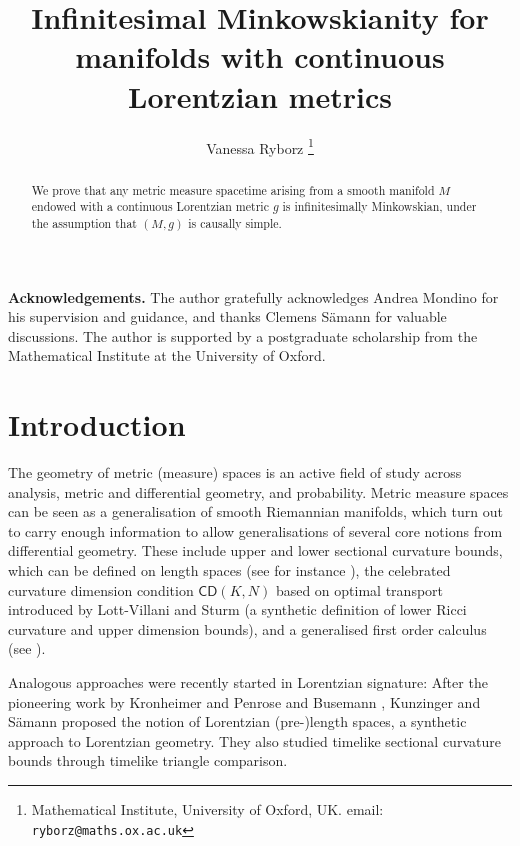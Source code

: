 \documentclass[a4paper,10pt]{article}
\title{Infinitesimal Minkowskianity for manifolds with continuous Lorentzian metrics}
\author{Vanessa Ryborz \thanks{{  Mathematical Institute, University of Oxford, UK. email: {\tt ryborz@maths.ox.ac.uk}}}}
\date{}
\numberwithin{equation}{section}
\newcommand{\cd}{\mathsf{CD}}
\begin{document}
\maketitle
\begin{abstract}
 We prove that any metric measure spacetime arising from a smooth manifold $M$ endowed with a continuous Lorentzian metric $g$ is infinitesimally Minkowskian, under the assumption that $(M, g)$ is causally simple.
 \let\thefootnote\relax{}
\end{abstract}
\tableofcontents

{\small \textbf{Acknowledgements.} 
The author gratefully acknowledges Andrea Mondino for his supervision and guidance, and thanks Clemens Sämann for valuable discussions. The author is supported by a postgraduate scholarship from the Mathematical Institute at the University of Oxford. 
}

\section{Introduction}


The geometry of metric (measure) spaces is an active field of study  across analysis, metric and differential geometry, and probability.
Metric measure spaces can be seen as a generalisation of smooth Riemannian manifolds, which turn out to carry enough information  to allow generalisations of several core notions from differential geometry. These include upper and lower sectional curvature bounds, which can be defined on length spaces (see for instance \cite{alexander2024alexandrov}), the celebrated curvature dimension condition $\cd(K, N)$ based on optimal transport introduced by Lott-Villani \cite{lott2009ricci, LottVillaniJFA} and Sturm \cite{sturm2006geometryI, sturm2006geometryII} (a synthetic definition of lower Ricci curvature and upper dimension bounds), and a generalised first order calculus (see \cite{ambrosio2014inventio}). 

Analogous approaches were recently started in Lorentzian signature: After the pioneering work by Kronheimer and Penrose \cite{kronheimer1967structure} and Busemann \cite{busemann1967timelike}, Kunzinger and S\"amann \cite{kunzinger2018lorentzian} proposed the notion of Lorentzian {(pre-)}length spaces, a synthetic approach to Lorentzian geometry. They also studied timelike sectional curvature bounds through timelike triangle comparison. 
\end{document}
